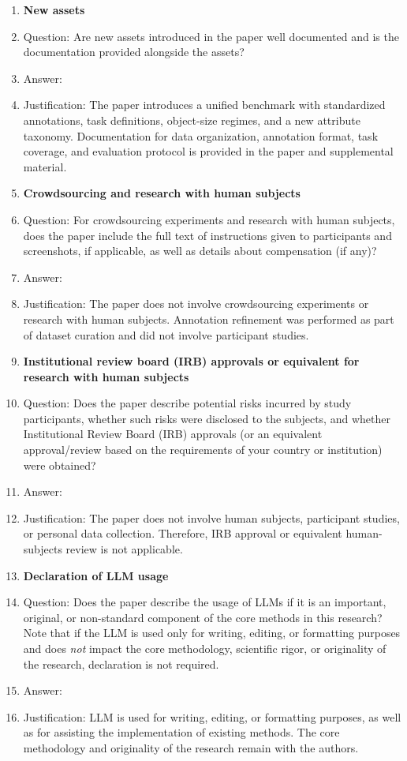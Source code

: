 \begin{enumerate}
\item {\bf New assets}
    \item[] Question: Are new assets introduced in the paper well documented and is the documentation provided alongside the assets?
   \item[] Answer: \answerYes{}
    \item[] Justification: The paper introduces a unified benchmark with standardized annotations, task definitions, object-size regimes, and a new attribute taxonomy. Documentation for data organization, annotation format, task coverage, and evaluation protocol is provided in the paper and supplemental material.


\item {\bf Crowdsourcing and research with human subjects}
    \item[] Question: For crowdsourcing experiments and research with human subjects, does the paper include the full text of instructions given to participants and screenshots, if applicable, as well as details about compensation (if any)? 
    \item[] Answer: \answerNA{}
    \item[] Justification: The paper does not involve crowdsourcing experiments or research with human subjects. Annotation refinement was performed as part of dataset curation and did not involve participant studies.


\item {\bf Institutional review board (IRB) approvals or equivalent for research with human subjects}
    \item[] Question: Does the paper describe potential risks incurred by study participants, whether such risks were disclosed to the subjects, and whether Institutional Review Board (IRB) approvals (or an equivalent approval/review based on the requirements of your country or institution) were obtained?
     \item[] Answer: \answerNA{}
    \item[] Justification: The paper does not involve human subjects, participant studies, or personal data collection. Therefore, IRB approval or equivalent human-subjects review is not applicable.


\item {\bf Declaration of LLM usage}
    \item[] Question: Does the paper describe the usage of LLMs if it is an important, original, or non-standard component of the core methods in this research? Note that if the LLM is used only for writing, editing, or formatting purposes and does \emph{not} impact the core methodology, scientific rigor, or originality of the research, declaration is not required.
    \item[] Answer: \answerNA{} %
    \item[] Justification: LLM is used for writing, editing, or formatting purposes, as well as for assisting the implementation of existing methods. The core methodology and originality of the research remain with the authors.

\end{enumerate}